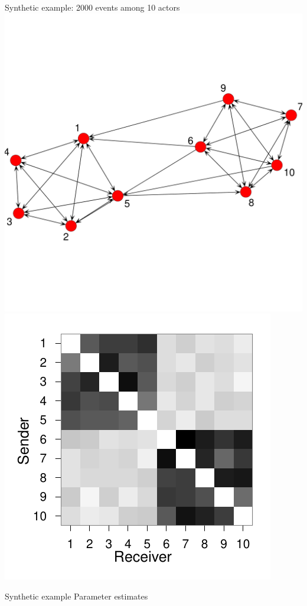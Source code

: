 \documentclass{beamer}
\begin{document}
\begin{frame}{Synthetic example: 2000 events among 10 actors}
\includegraphics[scale=.12]{../../figs/synthetic/network}
\includegraphics[scale=.7]{../../figs/synthetic/mat}
\end{frame}


\begin{frame}{Synthetic example}
Parameter estimates

\end{frame}
\end{document}
